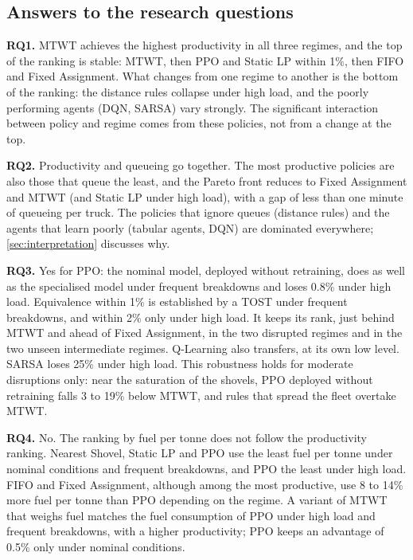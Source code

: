 \documentclass[11pt,a4paper]{article}
\newif\ifrevmarks
\newcommand{\revtag}[1]{\ifrevmarks\textsuperscript{\textcolor{red!70!black}{\scriptsize[#1]}}\fi}
\newenvironment{revbloc}[1]{\par\ifrevmarks\color{revcolor}\noindent\revtag{#1}\ \fi}{\par}
\newif\ifcorrmarks
\newcommand{\corr}[1]{\ifcorrmarks\textcolor{corrcolor}{#1}\else#1\fi}
\begin{document}
\subsection{Answers to the research questions}

\begin{revbloc}{T31}
\textbf{RQ1.} MTWT achieves the highest productivity in all three regimes, and the top of the ranking is stable: MTWT, then PPO and \corr{Static LP} within 1\%, then FIFO and Fixed Assignment. What changes from one regime to another is the bottom of the ranking: the distance rules collapse under high load, and the poorly performing agents (DQN, SARSA) vary strongly. The significant interaction between policy and regime comes from these policies, not from a change at the top.

\textbf{RQ2.} Productivity and queueing go together. The most productive policies are also those that queue the least, and the Pareto front reduces to Fixed Assignment and MTWT (and \corr{Static LP} under high load), with a gap of less than one minute of queueing per truck. \corr{The policies that ignore queues (distance rules) and the agents that learn poorly (tabular agents, DQN) are dominated everywhere; \cref{sec:interpretation} discusses why.}

\textbf{RQ3.} Yes for PPO: the nominal model, deployed without retraining, does as well as the specialised model under frequent breakdowns and loses 0.8\% under high load. \corr{Equivalence within 1\% is established by a TOST under frequent breakdowns, and within 2\% only under high load.} It keeps its rank, just behind MTWT and ahead of Fixed Assignment, in the two disrupted regimes and in the two unseen intermediate regimes. Q-Learning also transfers, at its own low level. SARSA loses 25\% under high load. \corr{This robustness holds for moderate disruptions only: near the saturation of the shovels, PPO deployed without retraining falls 3 to 19\% below MTWT, and rules that spread the fleet overtake MTWT.}

\textbf{RQ4.} No. The ranking by fuel per tonne does not follow the productivity ranking. Nearest Shovel, \corr{Static LP} and PPO use the least fuel per tonne under nominal conditions and frequent breakdowns, and PPO the least under high load. FIFO and Fixed Assignment, although among the most productive, use 8 to 14\% more fuel per tonne than PPO depending on the regime. \corr{A variant of MTWT that weighs fuel matches the fuel consumption of PPO under high load and frequent breakdowns, with a higher productivity; PPO keeps an advantage of 0.5\% only under nominal conditions.}
\end{revbloc}
\end{document}
